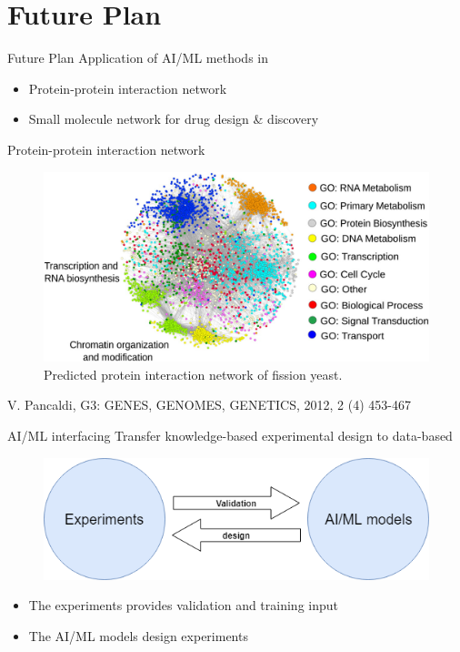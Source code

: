 \documentclass{beamer}
\begin{document}
\section{Future Plan}
\begin{frame}{Future Plan}
Application of AI/ML methods in 
\begin{itemize}
	\item Protein-protein interaction network 
	\item Small molecule network for drug design \& discovery 
\end{itemize}
\end{frame}

\begin{frame}{Protein-protein interaction network} 
\begin{figure}
	\includegraphics[width=\linewidth]{Pics/PPI_network.jpg} 
	\caption{Predicted protein interaction network of fission yeast. }
\end{figure}
\vfill \hfill {\tiny V. Pancaldi, G3: GENES, GENOMES, GENETICS, 2012, 2 (4) 453-467}
\end{frame}

\begin{frame}{AI/ML interfacing} 
Transfer knowledge-based experimental design to data-based
\begin{figure}
	\includegraphics[width=.7\linewidth]{Pics/Exp_AI.png}
\end{figure} 
\begin{itemize}
	\item The experiments provides validation and training input 
	\item The AI/ML models design experiments   
\end{itemize} 
\end{frame}
\end{document}
